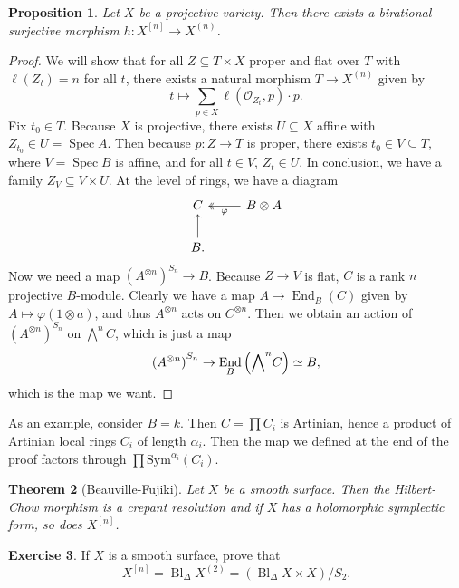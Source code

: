 \documentclass[leqno, openany]{memoir}
\newtheorem{thm}{Theorem}[section]
\newtheorem{prop}[thm]{Proposition}
\theoremstyle{definition}
\newtheorem{exer}[thm]{Exercise}
\theoremstyle{remark}
\theoremstyle{plain}
\theoremstyle{definition}
\theoremstyle{remark}
\newcommand{\mc}[1]{\mathcal{#1}}
\newcommand{\mr}[1]{\mathrm{#1}}
\DeclareMathOperator{\End}{End}
\DeclareMathOperator{\Spec}{Spec}
\DeclareMathOperator{\Bl}{Bl}
\begin{document}
\begin{prop}
    Let $X$ be a projective variety. Then there exists a birational surjective morphism $h \colon X^{[n]} \to X^{(n)}$.
\end{prop}

\begin{proof}
    We will show that for all $Z \subseteq T \times X$ proper and flat over $T$ with $\ell(Z_t) = n$ for all $t$, there exists a natural morphism $T \to X^{(n)}$ given by
    \[ t \mapsto \sum_{p \in X} \ell(\mc{O}_{Z_t}, p) \cdot p. \]
    Fix $t_0 \in T$. Because $X$ is projective, there exists $U \subseteq X$ affine with $Z_{t_0} \in U = \Spec A$. Then because $p \colon Z \to T$ is proper, there exists $t_0 \in V \subseteq T$, where $V = \Spec B$ is affine, and for all $t \in V$, $Z_t \in U$. In conclusion, we have a family $Z_V \subseteq V \times U$. At the level of rings, we have a diagram
    \begin{equation*}
    \begin{tikzcd}
        C & B \otimes A \ar[twoheadrightarrow]{l}{\varphi} \\
        B \ar{u}.
    \end{tikzcd}
    \end{equation*}
    Now we need a map ${(A^{\otimes n})}^{S_n} \to B$. Because $Z \to V$ is flat, $C$ is a rank $n$ projective $B$-module. Clearly we have a map $A \to \End_B(C)$ given by $A \mapsto \varphi(1 \otimes a)$, and thus $A^{\otimes n}$ acts on $C^{\otimes n}$. Then we obtain an action of ${(A^{\otimes n})}^{S_n}$ on $\bigwedge^n C$, which is just a map
    \[ {(A^{\otimes n})}^{S_n} \to \End_B\qty({\bigwedge}^n C) \simeq B, \]
    which is the map we want.
\end{proof}

As an example, consider $B = k$. Then $C = \prod C_i$ is Artinian, hence a product of Artinian local rings $C_i$ of length $\alpha_i$. Then the map we defined at the end of the proof factors through $\prod \mr{Sym}^{\alpha_i}(C_i)$.

\begin{thm}[Beauville-Fujiki]
    Let $X$ be a smooth surface. Then the Hilbert-Chow morphism is a crepant resolution and if $X$ has a holomorphic symplectic form, so does $X^{[n]}$.
\end{thm}

\begin{exer}
    If $X$ is a smooth surface, prove that
    \[ X^{[n]} = \Bl_{\Delta} X^{(2)} = (\Bl_{\Delta} X \times X) / S_2. \]
\end{exer}
\end{document}
